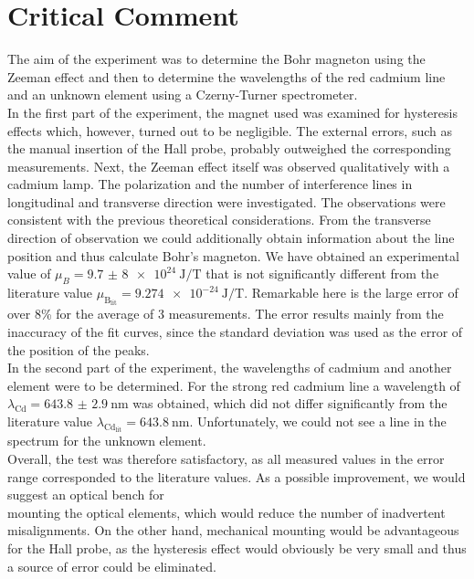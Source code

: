 \section{Critical Comment}
The aim of the experiment was to determine the Bohr magneton using the Zeeman effect and then to determine the wavelengths of the red cadmium line and an unknown element using a Czerny-Turner spectrometer.\\
In the first part of the experiment, the magnet used was examined for hysteresis effects which, however, turned out to be negligible.
The external errors, such as the manual insertion of the Hall probe, probably outweighed the corresponding measurements.
Next, the Zeeman effect itself was observed qualitatively with a cadmium lamp.
The polarization and the number of interference lines in longitudinal and transverse direction were investigated.
The observations were consistent with the previous theoretical considerations.
From the transverse direction of observation we could additionally obtain information about the line position and thus calculate Bohr's magneton.
We have obtained an experimental value of $\mu_{B} = \SI{9. 7(8)e24}{\joule\per\tesla}$ that is not significantly different from the literature value $\mu_{\text{B}_\text{lit}} = \SI{9. 274e-24}{\joule\per\tesla}$.
Remarkable here is the large error of over 8\% for the average of 3 measurements.
The error results mainly from the inaccuracy of the fit curves, since the standard deviation was used as the error of the position of the peaks.\\
In the second part of the experiment, the wavelengths of cadmium and another element were to be determined. For the strong red cadmium line a wavelength of $\lambda_\text{Cd}= \SI{643.8(29)}{\nano\meter}$ was obtained, which did not differ significantly from the literature value $\lambda_{\text{Cd}_\text{lit}} = \SI{643.8}{\nano\meter}$.
Unfortunately, we could not see a line in the spectrum for the unknown element.\\
Overall, the test was therefore satisfactory, as all measured values in the error range corresponded to the literature values.
As a possible improvement, we would suggest an optical bench for\\mounting the optical elements, which would reduce the number of inadvertent misalignments.
On the other hand, mechanical mounting would be advantageous for the Hall probe, as the hysteresis effect would obviously be very small and thus a source of error could be eliminated.